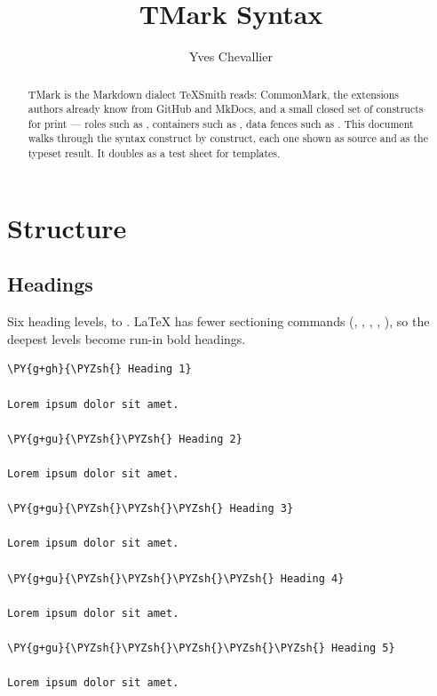 \documentclass[a4paper,twoside]{article}
\title{TMark Syntax}
\author{Yves Chevallier}\date{}
\begin{document}
\maketitle
\begin{abstract}
TMark is the Markdown dialect TeXSmith reads: CommonMark, the extensions authors already know from GitHub and MkDocs, and a small closed set of constructs for print --- roles such as , containers such as , data fences such as . This document walks through the syntax construct by construct, each one shown as source and as the typeset result. It doubles as a test sheet for templates.
\end{abstract}
\tableofcontents
\section{Structure}
\subsection{Headings}
Six heading levels, \tscodeinline{\#} to \tscodeinline{\#\#\#\#\#\#}. \LaTeX{} has fewer sectioning commands (, , , , ), so the deepest levels become run-in bold headings.
\begin{tscode}[lang=md, engine=pygments]
\begin{Verbatim}[commandchars=\\\{\},breaklines, breakanywhere, commandchars=\\\{\}]
\PY{g+gh}{\PYZsh{} Heading 1}

Lorem ipsum dolor sit amet.

\PY{g+gu}{\PYZsh{}\PYZsh{} Heading 2}

Lorem ipsum dolor sit amet.

\PY{g+gu}{\PYZsh{}\PYZsh{}\PYZsh{} Heading 3}

Lorem ipsum dolor sit amet.

\PY{g+gu}{\PYZsh{}\PYZsh{}\PYZsh{}\PYZsh{} Heading 4}

Lorem ipsum dolor sit amet.

\PY{g+gu}{\PYZsh{}\PYZsh{}\PYZsh{}\PYZsh{}\PYZsh{} Heading 5}

Lorem ipsum dolor sit amet.
\end{Verbatim}
\end{tscode}
\end{document}
